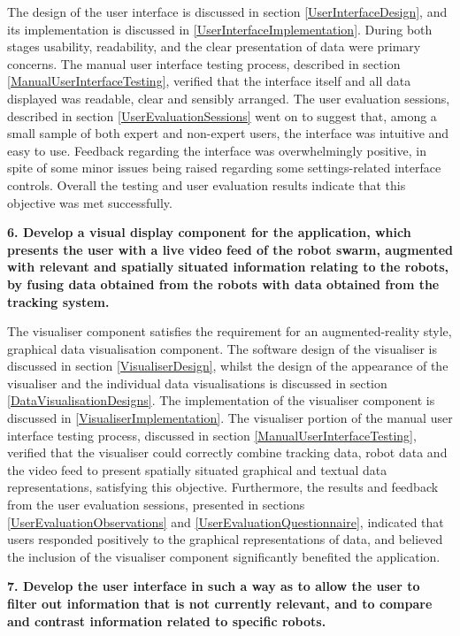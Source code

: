 The design of the user interface is discussed in section \ref{UserInterfaceDesign}, and its implementation is discussed in \ref{UserInterfaceImplementation}. During both stages usability, readability, and the clear presentation of data were primary concerns. The manual user interface testing process, described in section \ref{ManualUserInterfaceTesting}, verified that the interface itself and all data displayed was readable, clear and sensibly arranged. The user evaluation sessions, described in section \ref{UserEvaluationSessions} went on to suggest that, among a small sample of both expert and non-expert users, the interface was intuitive and easy to use. Feedback regarding the interface was overwhelmingly positive, in spite of some minor issues being raised regarding some settings-related interface controls. Overall the testing and user evaluation results indicate that this objective was met successfully.

\noindent \textbf{6. Develop a visual display component for the application, which presents the user with a live video feed of the robot swarm, augmented with relevant and spatially situated information relating to the robots, by fusing data obtained from the robots with data obtained from the tracking system.}

The visualiser component satisfies the requirement for an augmented-reality style, graphical data visualisation component. The software design of the visualiser is discussed in section \ref{VisualiserDesign}, whilst the design of the appearance of the visualiser and the individual data visualisations is discussed in section \ref{DataVisualisationDesigns}. The implementation of the visualiser component is discussed in \ref{VisualiserImplementation}. The visualiser portion of the manual user interface testing process, discussed in section \ref{ManualUserInterfaceTesting}, verified that the visualiser could correctly combine tracking data, robot data and the video feed to present spatially situated graphical and textual data representations, satisfying this objective. Furthermore, the results and feedback from the user evaluation sessions, presented in sections \ref{UserEvaluationObservations} and \ref{UserEvaluationQuestionnaire}, indicated that users responded positively to the graphical representations of data, and believed the inclusion of the visualiser component significantly benefited the application.

\noindent \textbf{7. Develop the user interface in such a way as to allow the user to filter out information that is not currently relevant, and to compare and contrast information related to specific robots.}


